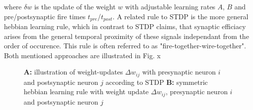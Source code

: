 \documentclass[letterpaper, 10 pt, conference]{ieeeconf}  %
\begin{document}
where $\delta w$ is the update of the weight $w$ with adjustable learning rates $A$, $B$ and pre/postsynaptic fire times $t_{pre}$/$t_{post}$. A 
related rule to STDP is the more general hebbian learning rule, which in contrast to STDP claims, that synaptic efficiacy arises from the 
general temporal proximity of these signals independant from the order of occurence. This rule is often referred to as "fire-together-wire-together".
Both mentioned approaches are illustrated in Fig. x 

\begin{figure}[thpb]
        \centering
  \caption{\textbf{A: } illustration of weight-updates $\Delta w_{ij}$ with presynaptic neuron $i$ and postsynaptic neuron $j$ according to STDP \newline 
  \textbf{B: } symmetric hebbian learning rule with weight update $\Delta w_{ij}$, presynaptic neuron $i$ and postsynaptic neuron $j$}
        \label{figurelabel}
\end{figure}
\end{document}
